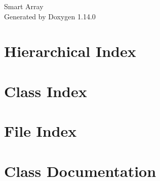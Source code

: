 \documentclass[twoside]{book}
\newcommand{\+}{\discretionary{\mbox{\scriptsize$\hookleftarrow$}}{}{}}
\newcommand{\clearemptydoublepage}{%
    \newpage{\pagestyle{empty}\cleardoublepage}%
  }
\begin{document}
  \raggedbottom
    \hypersetup{pageanchor=false,
                bookmarksnumbered=true,
                pdfencoding=unicode
               }
  \begin{titlepage}
  \vspace*{7cm}
  \begin{center}%
  {\Large Smart Array}\\
  \vspace*{1cm}
  {\large Generated by Doxygen 1.14.0}\\
  \end{center}
  \end{titlepage}
  \clearemptydoublepage
  \tableofcontents
  \clearemptydoublepage
  \hypersetup{pageanchor=true}
\chapter{Hierarchical Index}

\chapter{Class Index}

\chapter{File Index}

\chapter{Class Documentation}














\end{document}
